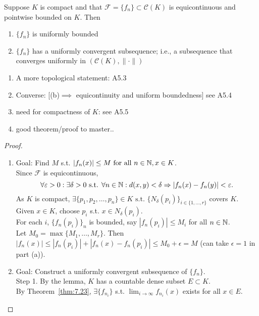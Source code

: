 \begin{thm}[25]
	Suppose $K$ is compact and that $\mathscr{F}=\{f_{n}\} \subset \mathscr{C}(K)$ is equicontinuous and pointwise bounded on $K$. Then
	\begin{enumerate}
		\item $\{f_{n}\} $ is uniformly bounded
		\item $\{f_{n}\}$ has a uniformly convergent subsequence; i.e., a subsequence that converges uniformly in $(\mathscr{C}(K), \|\cdot\|)$
	\end{enumerate}
	\begin{remark}
		\begin{enumerate}[label=\arabic*.]
			\item  A more topological statement: A5.3
			\item Converse: [(b)$\implies$ equicontinuity and uniform boundedness] see A5.4
			\item need for compactness of $K$: see A5.5
			\item good theorem/proof to master..
		\end{enumerate}
	\end{remark}
	\begin{proof}
		\begin{enumerate}
			\item Goal: Find $M$ s.t. $\left|f_{n}(x)\right| \le M	 \text{ for all } n \in \mathbb{N}, x \in K$.\\
			      Since $\mathscr{F}$ is equicontinuous,
			      \[
				      \forall{\varepsilon> 0}: \exists{\delta > 0} \text{ s.t. } \forall{n \in \ensuremath{\mathbb{N}}}: d(x,y)<\delta \Rightarrow \left|f_{n}(x)-f_{n}(y)\right|<\varepsilon
				      .\]
			      As $K$ is compact, $\exists{\{p_1,p_2,\ldots ,p_{n}\} \in K} \text{ s.t. } \{N_{\delta}(p_{i})\}_{i \in \{1,\ldots,r\}}$ covers $K$. Given $x \in K$, choose $p_{i}$ s.t. $x \in N_{\delta}(p_{i})$.\\
			      For each $i$, $\{f_{n}(p_{i})\}_n$ is bounded, say $\left|f_{n}(p_{i})\right|\le M_i$ for all $n \in \mathbb{N}$.\\
			      Let $M_0=\max\{M_1,\ldots ,M_r\}$. Then $\left|f_{n}(x)\right|\le \left|f_{n}(p_{i})\right|+\left|f_{n}(x)-f_{n}(p_{i})\right| \le M_0+\epsilon=M$ (can take $\epsilon=1$ in part (a)).
			\item Goal: Construct a uniformly convergent subsequence of $\{ {f}_{n}\}$.\\
			      Step 1. By the lemma, $K$ has a countable dense subset $E \subset K$.\\
			      By Theorem~\ref{thm:7.23}, $\exists{\{f_{n_i}\}}$ s.t. $\lim_{i\to \infty}{f_{n_i}(x)}$ exists for all $x \in E$.

\end{enumerate}
\end{proof}
\end{thm}
